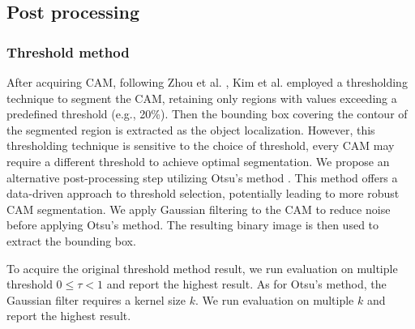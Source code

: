 \documentclass[conference]{IEEEtran}
\begin{document}
\subsection{Post processing}
\subsubsection{Threshold method}
After acquiring CAM, following Zhou et al. \cite{zhou2015cnnlocalization}, Kim et al. \cite{kim2022bridging} employed a thresholding technique to segment the CAM, retaining only regions with values exceeding a predefined threshold (e.g., 20\%). Then the bounding box covering the contour of the segmented region is extracted as the object localization. However, this thresholding technique is sensitive to the choice of threshold, every CAM may require a different threshold to achieve optimal segmentation. We propose an alternative post-processing step utilizing Otsu's method \cite{otsu}. This method offers a data-driven approach to threshold selection, potentially leading to more robust CAM segmentation. We apply Gaussian filtering to the CAM to reduce noise before applying Otsu's method. The resulting binary image is then used to extract the bounding box.

To acquire the original threshold method \cite{zhou2015cnnlocalization} result, we run evaluation on multiple threshold $0 \leq \tau < 1$ and report the highest result. As for Otsu's method, the Gaussian filter requires a kernel size $k$. We run evaluation on multiple $k$ and report the highest result.
\end{document}
